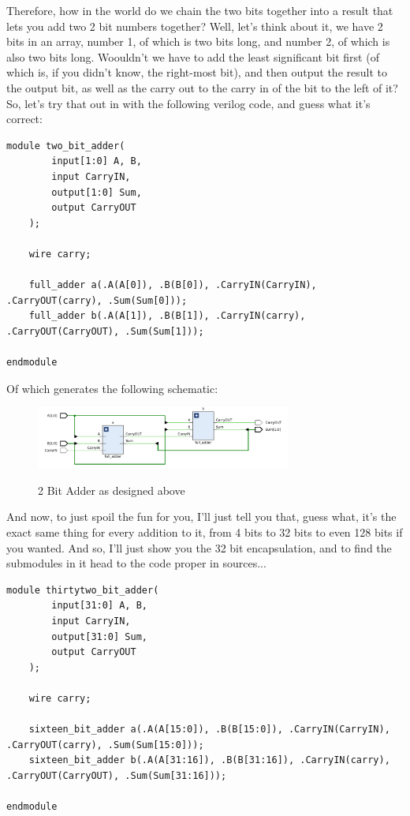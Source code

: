 \documentclass{article}
\begin{document}
Therefore, how in the world do we chain the two bits together into a result that lets you add two 2 bit numbers together? Well, let's think about it, we have 2 bits in an array, number 1, of which is two bits long, and number 2, of which is also two bits long. Woouldn't we have to add the least significant bit first (of which is, if you didn't know, the right-most bit), and then output the result to the output bit, as well as the carry out to the carry in of the bit to the left of it? So, let's try that out in with the following verilog code, and guess what it's correct:\\
\begin{lstlisting}[caption={2 Bit Adder Verilog Code}, label={2 Bit Adder Verilog}, style=Verilog]
module two_bit_adder(
        input[1:0] A, B,
        input CarryIN,
        output[1:0] Sum,
        output CarryOUT
    );
    
    wire carry;
    
    full_adder a(.A(A[0]), .B(B[0]), .CarryIN(CarryIN), .CarryOUT(carry), .Sum(Sum[0]));
    full_adder b(.A(A[1]), .B(B[1]), .CarryIN(carry), .CarryOUT(CarryOUT), .Sum(Sum[1]));
    
endmodule
\end{lstlisting}

Of which generates the following schematic:
\begin{figure}[!htbp]
    \centering
    \caption{2 Bit Adder as designed above}
    \includegraphics[width=0.75\textwidth]{pictures/part1/two_bit_adder.png}
    \label{2 Bit Adder}
\end{figure}\newpage

And now, to just spoil the fun for you, I'll just tell you that, guess what, it's the exact same thing for every addition to it, from 4 bits to 32 bits to even 128 bits if you wanted. And so, I'll just show you the 32 bit encapsulation, and to find the submodules in it head to the code proper in sources...
\begin{lstlisting}[caption={32 Bit Adder Verilog Code}, label={32 Bit Adder Verilog}, style=Verilog]
module thirtytwo_bit_adder(
        input[31:0] A, B,
        input CarryIN,
        output[31:0] Sum,
        output CarryOUT
    );
    
    wire carry;
    
    sixteen_bit_adder a(.A(A[15:0]), .B(B[15:0]), .CarryIN(CarryIN), .CarryOUT(carry), .Sum(Sum[15:0]));
    sixteen_bit_adder b(.A(A[31:16]), .B(B[31:16]), .CarryIN(carry), .CarryOUT(CarryOUT), .Sum(Sum[31:16]));
    
endmodule
\end{lstlisting}
\end{document}
